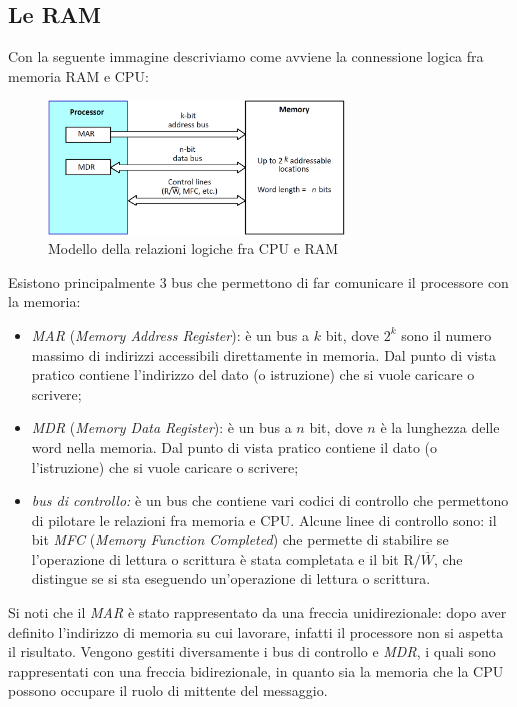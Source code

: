 \documentclass[class=book, crop=false, oneside]{standalone}
\begin{document}
\subsection{Le RAM}
Con la seguente immagine descriviamo come avviene la connessione logica fra memoria RAM e CPU:
\begin{figure}[H]
	\centering
	\includegraphics[width=0.7\textwidth,keepaspectratio]{relazione_cpu_ram.png}
	\caption{Modello della relazioni logiche fra CPU e RAM}
\end{figure}
Esistono principalmente 3 bus che permettono di far comunicare il processore con la memoria:
\begin{itemize}
	\item \emph{MAR} (\emph{Memory Address Register}): è un bus a \(k\) bit, dove \(2^k\) sono il numero massimo di indirizzi accessibili direttamente in memoria. Dal punto di vista pratico contiene l'indirizzo del dato (o istruzione) che si vuole caricare o scrivere;
	\item \emph{MDR} (\emph{Memory Data Register}): è un bus a \(n\) bit, dove \(n\) è la lunghezza delle word nella memoria. Dal punto di vista pratico contiene il dato (o l'istruzione) che si vuole caricare o scrivere;
	\item \emph{bus di controllo:} è un bus che contiene vari codici di controllo che permettono di pilotare le relazioni fra memoria e CPU. Alcune linee di controllo sono: il bit \emph{MFC} (\emph{Memory Function Completed}) che permette di stabilire se l'operazione di lettura o scrittura è stata completata e il bit \emph{\(\textrm{R/}\overline{W}\)}, che distingue se si sta eseguendo un'operazione di lettura o scrittura.
\end{itemize}
Si noti che il \emph{MAR} è stato rappresentato da una freccia unidirezionale: dopo aver definito l'indirizzo di memoria su cui lavorare, infatti il processore non si aspetta il risultato. Vengono gestiti diversamente i bus di controllo e \emph{MDR}, i quali sono rappresentati con una freccia bidirezionale, in quanto sia la memoria che la CPU possono occupare il ruolo di mittente del messaggio.
\end{document}

